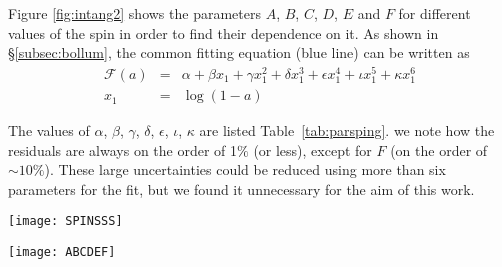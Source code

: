 \documentclass{aa}
\begin{document}
Figure \ref{fig:intang2} shows the parameters $A$, $B$, $C$, $D$, $E$ and $F$ for different values of the spin in order to find their dependence on it. As shown in \S \ref{subsec:bollum}, the common fitting equation (blue line) can be written as
	\begin{eqnarray} \label{eq:kerrparaap}
		\mathcal{F}(a) &=& \alpha + \beta x_1 + \gamma x_1^2 + \delta x_1^3 + \epsilon x_1^4 + \iota x_1^5 + \kappa x_1^6
		\nonumber \\
		x_1 &=& \log(1-a)
	\end{eqnarray}

The values of $\alpha$, $\beta$, $\gamma$, $\delta$, $\epsilon$, $\iota$, $\kappa$ are listed Table~\ref{tab:parsping}. we note how the residuals are always on the order of 1$\%$ (or less), except for $F$ (on the order of $\sim 10\%$). These large uncertainties could be reduced using more than six parameters for the fit, but we found it unnecessary for the aim of this work.

\begin{figure*} 
\centering
\texttt{[image: SPINSSS]}
\caption{KERRBB disk bolometric luminosity (in units of erg/s) as a function of the viewing angle of the disk, in the cases with $a = -1$, $a = -0.6$, $a = 0.6$ and $a = 0.998$, with $\dot{M} = 10^{18}$ g/s. The fitting function (blue line) has the general form of~\eqref{eq:kerrfinale} with different values for the parameters, in the different cases. We note the different behaviors: in the cases $a = -1$, $-0.6$ and $0.6$, the bolometric luminosity, between the cases $0^{\circ}$ and $85^{\circ}$, decreases by a factor of $\sim 7$, $6.6$ and $4.4$, respectively. In the case with $a = 0.998$, the luminosity reaches a maximum value at $\sim 64^{\circ}$ (see Table~\ref{tab:angmax}) then drops at larger viewing angles.      \label{fig:intang}}
\end{figure*}

\begin{figure*} 
\centering
\texttt{[image: ABCDEF]}
\caption{Parameters $A$, $B$, $C$, $D$, $E$ and $F$ of Eq. \eqref{eq:kerrfinale} as a function of the black hole spin $a$. The fitting function (blue line) has the general form of Eq. \eqref{eq:kerrpara}. We note how the residuals are always on the order of 1$\%$ (or less), except for $F$ (on the order of $\sim 10\%$). These relatively large residuals for $F$ could be reduced using more than six parameters for the fit, but we found it unnecessary for the aim of this work. Red bars are associated with the uncertainties on the parameter values from the fit of the bolometric luminosity at different viewing angles (Fig. \ref{fig:intang}.)    \label{fig:intang2}}
\end{figure*}
\end{document}
